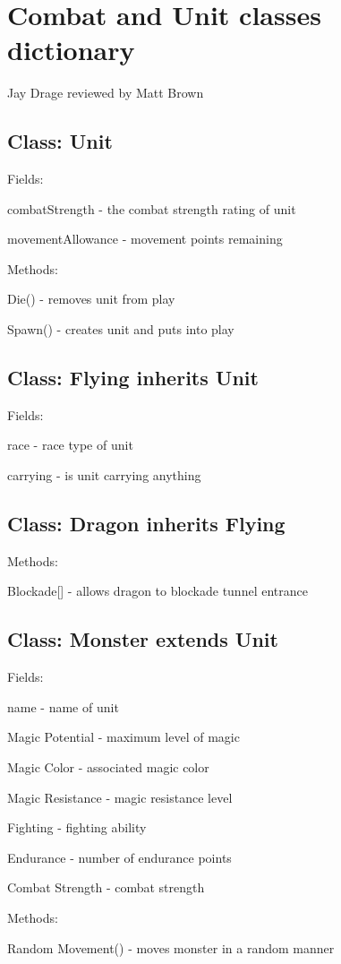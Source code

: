 \section*{Combat and Unit classes dictionary}
Jay Drage
reviewed by Matt Brown

\subsection*{Class:  Unit}
\begin{al}
	\item[Fields:] \parbox{\textwidth}{combatStrength - the combat strength rating of unit}
    \item[] \parbox{\textwidth}{movementAllowance - movement points remaining}
	\item[Methods:]	\parbox{\textwidth}{Die()  -  removes unit from play}
	\item[] \parbox{\textwidth}{Spawn() - creates unit and puts into play}
\end{al}


\subsection*{Class:  Flying inherits Unit}
\begin{al}
	\item[Fields:] \parbox{\textwidth}{race - race type of unit}
	\item[] \parbox{\textwidth}{carrying - is unit carrying anything}
\end{al}

\subsection*{Class: Dragon inherits Flying}
\begin{al}
	\item[Methods:] \parbox{\textwidth}{Blockade[] - allows dragon to blockade tunnel entrance}
\end{al}

\subsection*{Class:  Monster  extends  Unit}
\begin{al}
	\item[Fields:] \parbox{\textwidth}{name - name of unit}
    \item[] \parbox{\textwidth}{Magic Potential - maximum level of magic}
    \item[] \parbox{\textwidth}{Magic Color - associated magic color}
    \item[] \parbox{\textwidth}{Magic Resistance - magic resistance level}
    \item[] \parbox{\textwidth}{Fighting - fighting ability}
    \item[] \parbox{\textwidth}{Endurance - number of endurance points}
    \item[] \parbox{\textwidth}{Combat Strength - combat strength}
	\item[Methods:]\parbox{\textwidth}{Random Movement() - moves monster in a random manner}
\end{al}

